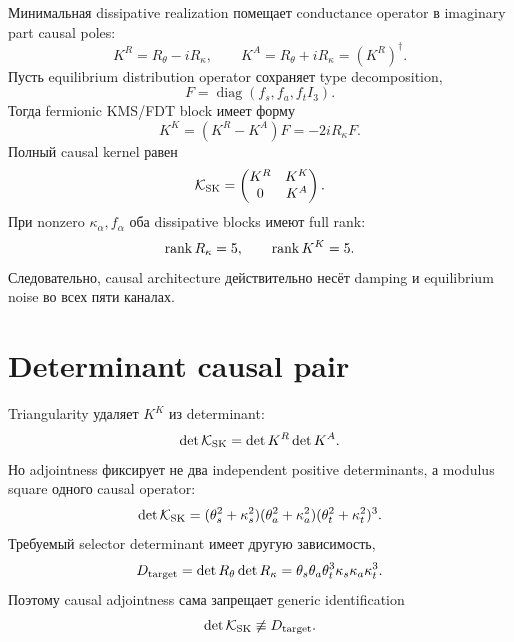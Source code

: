 Минимальная dissipative realization помещает conductance operator в
imaginary part causal poles:
\begin{equation}
 K^R=R_\theta-iR_\kappa,
 \qquad
 K^A=R_\theta+iR_\kappa=(K^R)^\dagger.
 \label{eq:v9-kms-keldysh-ra-pair}
\end{equation}
Пусть equilibrium distribution operator сохраняет type decomposition,
\begin{equation}
 F=\operatorname{diag}(f_s,f_a,f_t I_3).
 \label{eq:v9-kms-keldysh-distribution}
\end{equation}
Тогда fermionic KMS/FDT block имеет форму
\begin{equation}
 K^K=(K^R-K^A)F=-2iR_\kappa F.
 \label{eq:v9-kms-keldysh-fdt}
\end{equation}
Полный causal kernel равен
\begin{equation}
 \mathcal K_{\rm SK}=
 \begin{pmatrix}K^R&K^K\\0&K^A\end{pmatrix}.
 \label{eq:v9-kms-keldysh-full-kernel}
\end{equation}
При nonzero $\kappa_\alpha,f_\alpha$ оба dissipative blocks имеют full rank:
\begin{equation}
 \operatorname{rank} R_\kappa=5,
 \qquad \operatorname{rank} K^K=5.
 \label{eq:v9-kms-keldysh-dissipative-ranks}
\end{equation}
Следовательно, causal architecture действительно несёт damping и
equilibrium noise во всех пяти каналах.

\section{Determinant causal pair}

Triangularity удаляет $K^K$ из determinant:
\begin{equation}
 \det\mathcal K_{\rm SK}=\det K^R\det K^A.
 \label{eq:v9-kms-keldysh-triangular-determinant}
\end{equation}
Но adjointness фиксирует не два independent positive determinants, а
modulus square одного causal operator:
\begin{equation}
 \det\mathcal K_{\rm SK}=
 (\theta_s^2+\kappa_s^2)
 (\theta_a^2+\kappa_a^2)
 (\theta_t^2+\kappa_t^2)^3.
 \label{eq:v9-kms-keldysh-spectral-determinant}
\end{equation}
Требуемый selector determinant имеет другую зависимость,
\begin{equation}
 D_{\rm target}=\det R_\theta\det R_\kappa
 =\theta_s\theta_a\theta_t^3\kappa_s\kappa_a\kappa_t^3.
 \label{eq:v9-kms-keldysh-target-determinant}
\end{equation}
Поэтому causal adjointness сама запрещает generic identification
\begin{equation}
 \det\mathcal K_{\rm SK}\not\equiv D_{\rm target}.
 \label{eq:v9-kms-keldysh-generic-mismatch}
\end{equation}

